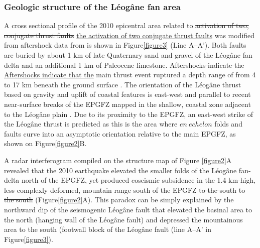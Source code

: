 \documentclass[linenumbers,draft]{agujournal}
\providecommand{\DIFadd}[1]{{\protect\color{blue}\uwave{#1}}} %
\providecommand{\DIFdel}[1]{{\protect\color{red}\sout{#1}}}                      %
\providecommand{\DIFaddbegin}{} %
\providecommand{\DIFaddend}{} %
\providecommand{\DIFdelbegin}{} %
\providecommand{\DIFdelend}{} %
\begin{document}
\subsubsection{Geologic structure of the L\'eog\^ane fan area}
A cross sectional profile of the 2010 epicentral area related to \DIFdelbegin \DIFdel{activation of two, conjugate thrust faults }\DIFdelend \DIFaddbegin \ul{the activation of two conjugate thrust faults} \DIFaddend was modified from aftershock data from \citet{douilly2013crustal,douilly2015three} is shown in Figure\DIFaddbegin \DIFadd{~}\DIFaddend \ref{figure3} (Line A--A'). Both faults are buried by about 1 km of late Quaternary sand and gravel of the L\'eog\^ane fan delta \citep{kocel2016near} and an additional 1 km of Paleocene limestone. \DIFdelbegin \DIFdel{Aftershocks indicate the }\DIFdelend \DIFaddbegin \ul{Aftershocks indicate that the} \DIFaddend main thrust event ruptured a depth range of from 4 to 17 km beneath the ground surface \citep{douilly2013crustal,douilly2015three}. The orientation of the L\'eog\^ane thrust based on gravity and uplift of coastal features is east-west and parallel to recent near-surface breaks of the EPGFZ mapped in the shallow, coastal zone adjacent to the L\'eog\^ane plain \citep{hornbach2010high}. Due to its proximity to the EPGFZ, an east-west strike of the L\'eog\^ane thrust is predicted as this is the area where $en~echelon$ folds and faults curve into an asymptotic orientation relative to the main EPGFZ, as shown on Figure\DIFaddbegin \DIFadd{~}\DIFaddend \ref{figure2}B.

A radar interferogram compiled on the structure map of Figure \ref{figure2}A revealed that the 2010 earthquake elevated the smaller folds of the L\'eog\^ane fan-delta north of the EPGFZ, yet produced coseismic subsidence in the 1.4 km-high, less complexly deformed, mountain range south of the EPGFZ \DIFdelbegin \DIFdel{to the south }\DIFdelend \DIFaddbegin \st{to the south} \DIFaddend \citep{hashimoto2011fan} (Figure\DIFaddbegin \DIFadd{~}\DIFaddend \ref{figure2}A). This paradox can be simply explained by the northward dip of the seismogenic L\'eog\^ane fault that elevated the basinal area to the north (hanging wall of the L\'eog\^ane fault) and depressed the mountainous area to the south (footwall block of the L\'eog\^ane fault (line A--A' in Figure\DIFaddbegin \DIFadd{~}\DIFaddend \ref{figure3}). 
\end{document}
